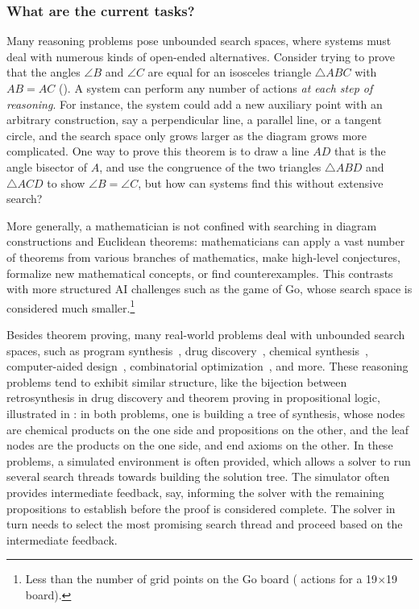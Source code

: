 \subsubsection{What are the current tasks?}
\label{sec:reasoning-tasks}

Many reasoning problems pose unbounded search spaces, where systems must deal with numerous kinds of open-ended alternatives. Consider trying to prove that the angles $\angle B$ and $\angle C$ are equal for an isosceles triangle $\triangle ABC$ with $AB=AC$ (). A system can perform any number of actions \textit{at each step of reasoning}. For instance, the system could add a new auxiliary point with an arbitrary construction, say a perpendicular line, a parallel line, or a tangent circle, and the search space only grows larger as the diagram grows more complicated. One way to prove this theorem is to draw a line $AD$ that is the angle bisector of $A$, and use the congruence of the two triangles $\triangle ABD$ and $\triangle ACD$ to show $\angle B = \angle C$, but how can systems find this without extensive search?

More generally, a mathematician is not confined with searching in diagram constructions and Euclidean theorems: mathematicians can apply a vast number of theorems from various branches of mathematics, make high-level conjectures, formalize new mathematical concepts, or find counterexamples. This contrasts with more structured AI challenges such as the game of Go, whose search space is considered much smaller.\footnote{Less than the number of grid points on the Go board ( actions for a 19$\times$19 board).}

Besides theorem proving, many real-world problems deal with unbounded search spaces, such as program synthesis~\citep{DBLP:journals/ftpl/GulwaniPS17}, drug discovery~\citep{Drews2000DrugDA}, chemical synthesis~\citep{DBLP:journals/nature/SeglerPW18}, computer-aided design~\citep{computer_aided_design}, combinatorial optimization~\citep{DBLP:journals/eor/BengioLP21}, and more. 
These reasoning problems tend to exhibit similar structure, like the bijection between retrosynthesis in drug discovery and theorem proving in propositional logic, illustrated in : in both problems, one is building a tree of synthesis, whose nodes are chemical products on the one side and propositions on the other, and the leaf nodes are the products on the one side, and end axioms on the other. 
In these problems, a simulated environment is often provided, which allows a solver to run several search threads towards building the solution tree. The simulator often provides intermediate feedback, say, informing the solver with the remaining propositions to establish before the proof is considered complete. The solver in turn needs to select the most promising search thread and proceed based on the intermediate feedback.

